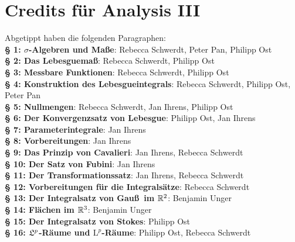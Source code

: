 \documentclass[a4paper,twoside,DIV15,BCOR12mm,chapterprefix=true,headings=onelinechapter]{scrbook}
\begin{document}
\renewcommand{\indexname}{Stichwortverzeichnis}
\printindex

\chapter{Credits für Analysis III} Abgetippt haben die folgenden Paragraphen:\\%
\textbf{§ 1: $\sigma$-Algebren und Maße}: Rebecca Schwerdt, Peter Pan, Philipp Ost\\
\textbf{§ 2: Das Lebesguemaß}: Rebecca Schwerdt, Philipp Ost\\
\textbf{§ 3: Messbare Funktionen}: Rebecca Schwerdt, Philipp Ost\\
\textbf{§ 4: Konstruktion des Lebesgueintegrals}: Rebecca Schwerdt, Philipp Ost, Peter Pan\\
\textbf{§ 5: Nullmengen}: Rebecca Schwerdt, Jan Ihrens, Philipp Ost\\
\textbf{§ 6: Der Konvergenzsatz von Lebesgue}: Philipp Ost, Jan Ihrens \\
\textbf{§ 7: Parameterintegrale}: Jan Ihrens \\
\textbf{§ 8: Vorbereitungen}: Jan Ihrens \\
\textbf{§ 9: Das Prinzip von Cavalieri}: Jan Ihrens, Rebecca Schwerdt\\
\textbf{§ 10: Der Satz von Fubini}: Jan Ihrens\\
\textbf{§ 11: Der Transformationssatz}: Jan Ihrens, Rebecca Schwerdt\\
\textbf{§ 12: Vorbereitungen für die Integralsätze}: Rebecca Schwerdt\\
\textbf{§ 13: Der Integralsatz von Gau\ss \ im \(\mathbb{R}^{2}\)}: Benjamin Unger\\ 
\textbf{§ 14: Flächen im \(\mathbb{R}^{3}\)}: Benjamin Unger\\
\textbf{§ 15: Der Integralsatz von Stokes}: Philipp Ost\\
\textbf{§ 16: \(\mathfrak{L}^{p}\)-Räume und \(\mathrm{L}^{p}\)-Räume}: Philipp Ost, Rebecca Schwerdt \\
\end{document}
